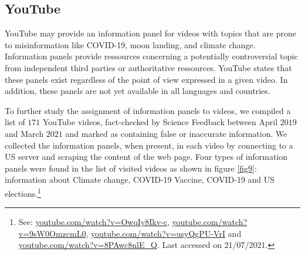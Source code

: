 \documentclass{article}
\begin{document}
\subsection{YouTube} \label{youtube_panels}

YouTube may provide an information panel for videos with topics that are prone to misinformation like COVID-19, moon landing, and climate change. Information panels provide ressources concerning a potentially controversial topic from independent third parties or authoritative ressources. YouTube states that these panels exist regardless of the point of view expressed in a given video. In addition, these panels are not yet available in all languages and countries. %

\smallskip

To further study the assignment of information panels to videos, we compiled a list of $171$ YouTube videos, fact-checked by Science Feedback between April $2019$ and March $2021$ and marked as containing false or inaccurate information. We collected the information panels, when present, in each video by connecting to a US server and scraping the content of the web page. Four types of information panels were found in the list of visited videos as shown in figure \ref{fig9}:  information about Climate change, COVID-19 Vaccine, COVID-19 and US elections.\footnote{See: \href{https://www.youtube.com/watch?v=OwqIy8Ikv-c}{youtube.com/watch?v=OwqIy8Ikv-c}, \href{https://www.youtube.com/watch?v=9sW0OmzcmL0}{youtube.com/watch?v=9sW0OmzcmL0}, \href{https://www.youtube.com/watch?v=usyQgPU-VrI}{youtube.com/watch?v=usyQgPU-VrI} and \href{https://www.youtube.com/watch?v=8PAwc8nlE\_Q}{youtube.com/watch?v=8PAwc8nlE\_Q}. Last accessed on  21/07/2021.  }
\end{document}
